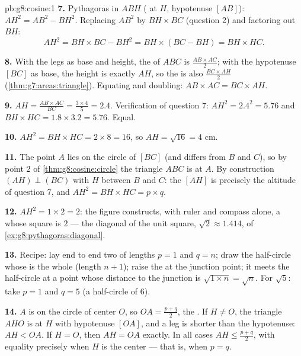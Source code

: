 \begin{solution}{pb:g8:cosine:1}
\textbf{7.} Pythagoras in $ABH$ ( at $H$, hypotenuse
$[AB]$): $AH^2 = AB^2 - BH^2$. Replacing $AB^2$ by
$BH \times BC$ (question 2) and factoring out $BH$:
\[
AH^2 = BH \times BC - BH^2
= BH \times (BC - BH)
= BH \times HC .
\]

\textbf{8.} With the legs as base and height, the  of $ABC$
is $\frac{AB \times AC}{2}$; with the hypotenuse $[BC]$ as base,
the height is exactly $AH$, so the  is also
$\frac{BC \times AH}{2}$ (\cref{thm:g7:areas:triangle}). Equating
and doubling: $AB \times AC = BC \times AH$.

\textbf{9.} $AH = \frac{AB \times AC}{BC} = \frac{3 \times 4}{5}
= 2.4$. Verification of question 7:
$AH^2 = 2.4^2 = 5.76$ and
$BH \times HC = 1.8 \times 3.2 = 5.76$. Equal.

\textbf{10.} $AH^2 = BH \times HC = 2 \times 8 = 16$, so
$AH = \sqrt{16} = 4$ cm.

\textbf{11.} The point $A$ lies on the circle of  $[BC]$
(and differs from $B$ and $C$), so by point 2 of
\cref{thm:g8:cosine:circle} the triangle $ABC$ is  at
$A$. By construction $(AH) \perp (BC)$ with $H$ between $B$ and
$C$: the  $[AH]$ is precisely the altitude of question 7,
and $AH^2 = BH \times HC = p \times q$.

\textbf{12.} $AH^2 = 1 \times 2 = 2$: the figure constructs, with
ruler and compass alone, a  whose square is $2$ --- the
diagonal of the unit square, $\sqrt2 \approx 1.414$, of
\cref{ex:g8:pythagoras:diagonal}.

\textbf{13.} Recipe: lay end to end two  of lengths
$p = 1$ and $q = n$; draw the half-circle whose  is the
whole  (length $n + 1$); raise the  at the
junction point; it meets the half-circle at a point whose
distance to the junction is $\sqrt{1 \times n} = \sqrt n$. For
$\sqrt5$: take $p = 1$ and $q = 5$ (a half-circle of 
$6$).

\textbf{14.} $A$ is on the circle of center $O$, so
$OA = \frac{p+q}{2}$, the . If $H \neq O$, the triangle
$AHO$ is  at $H$ with hypotenuse $[OA]$, and a leg is
shorter than the hypotenuse: $AH < OA$. If $H = O$, then
$AH = OA$ exactly. In all cases $AH \leq \frac{p+q}{2}$, with
equality precisely when $H$ is the center --- that is, when
$p = q$.


\end{solution}
